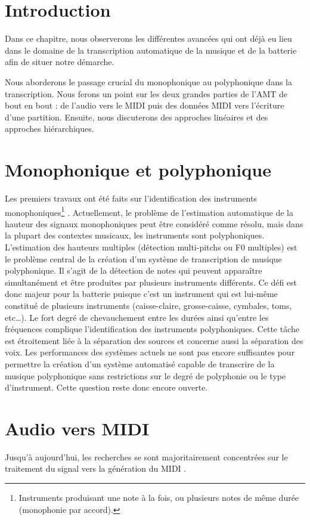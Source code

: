 \section*{Introduction}
Dans ce chapitre, nous 
observerons les différentes avancées qui ont déjà eu lieu dans le domaine de la transcription automatique 
de la musique et de la batterie afin de situer notre démarche.

Nous aborderons le passage crucial du monophonique au polyphonique dans la transcription. Nous ferons un point sur les deux grandes parties de l’AMT de bout en bout : de l’audio vers le MIDI puis des données MIDI vers l’écriture d’une partition. Ensuite, nous discuterons des approches linéaires et des approches hiérarchiques.

\section{Monophonique et polyphonique}
Les premiers travaux
ont été faits sur l’identification des instruments monophoniques\footnote{Instruments produisant une note à la fois, ou plusieurs notes de même durée (monophonie par accord).} \cite{future_directions}. Actuellement, le problème de l'estimation automatique de la hauteur des signaux monophoniques peut être considéré comme résolu, mais dans la plupart des contextes musicaux, les instruments sont polyphoniques. L'estimation des hauteurs multiples (détection multi-pitchs ou F0 multiples) est le problème central de la création d'un système de transcription de musique polyphonique. Il s’agit de la détection de notes qui peuvent apparaître simultanément et être produites par plusieurs instruments différents. Ce défi est donc majeur pour la batterie puisque c’est un instrument qui est lui-même constitué de plusieurs instruments (caisse-claire, grosse-caisse, cymbales, toms, etc…). Le fort degré de chevauchement entre les durées ainsi qu’entre les fréquences complique l’identification des instruments polyphoniques. Cette tâche est étroitement liée à la séparation des sources et concerne aussi la séparation des voix. Les performances des systèmes actuels ne sont pas encore suffisantes pour permettre la création d'un système automatisé capable de transcrire de la musique polyphonique sans restrictions sur le degré de polyphonie ou le type d'instrument. Cette question reste donc encore ouverte. 

\section{Audio vers MIDI}
Jusqu’à aujourd’hui, les recherches se sont majoritairement concentrées sur le traitement du signal 
vers la génération du MIDI \cite{AMT_for_2_Instru}. 

